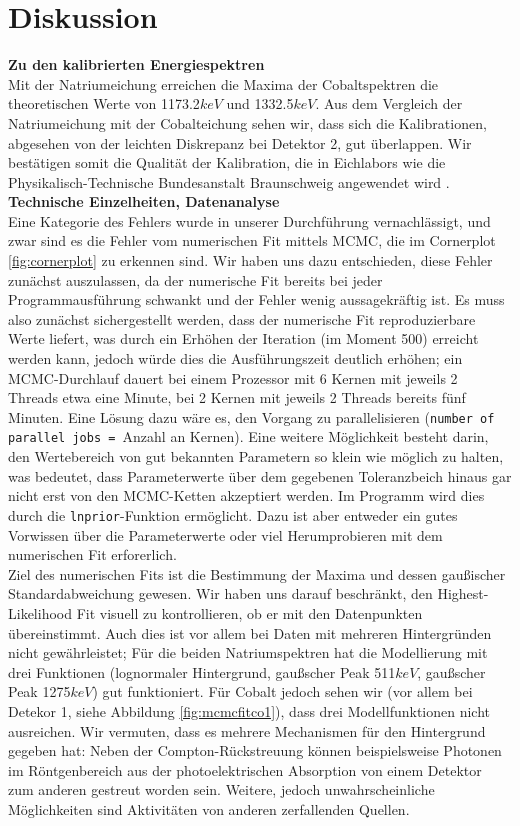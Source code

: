 \documentclass[%
aps,
onecolumn,
11pt,
tightenlines,
nofootinbib,
superscriptaddress,
floatfix,
prd,
]{revtex4-2}
\begin{document}
\section{Diskussion}
\label{sec:Diskussion}
\textbf{Zu den kalibrierten Energiespektren}\\
Mit der Natriumeichung erreichen die Maxima der Cobaltspektren die theoretischen Werte von 1173.2$keV$ und 1332.5$keV$. Aus dem Vergleich der Natriumeichung mit der Cobalteichung sehen wir, dass sich die Kalibrationen, abgesehen von der leichten Diskrepanz bei Detektor 2, gut überlappen. Wir bestätigen somit die Qualität der Kalibration, die in Eichlabors wie die Physikalisch-Technische Bundesanstalt Braunschweig angewendet wird \cite{manual1}.\vspace{10pt}\\
\textbf{Technische Einzelheiten, Datenanalyse}\\
Eine Kategorie des Fehlers wurde in unserer Durchführung vernachlässigt, und zwar sind es die Fehler vom numerischen Fit mittels MCMC, die im Cornerplot \ref{fig:cornerplot} zu erkennen sind. Wir haben uns dazu entschieden, diese Fehler zunächst auszulassen, da der numerische Fit bereits bei jeder Programmausführung schwankt und der Fehler wenig aussagekräftig ist. Es muss also zunächst sichergestellt werden, dass der numerische Fit reproduzierbare Werte liefert, was durch ein Erhöhen der Iteration (im Moment 500) erreicht werden kann, jedoch würde dies die Ausführungszeit deutlich erhöhen; ein MCMC-Durchlauf dauert bei einem Prozessor mit 6 Kernen mit jeweils 2 Threads etwa eine Minute, bei 2 Kernen mit jeweils 2 Threads bereits fünf Minuten. Eine Lösung dazu wäre es, den Vorgang zu parallelisieren (\texttt{number of parallel jobs = }Anzahl an Kernen). Eine weitere Möglichkeit besteht darin, den Wertebereich von gut bekannten Parametern so klein wie möglich zu halten, was bedeutet, dass Parameterwerte über dem gegebenen Toleranzbeich hinaus gar nicht erst von den MCMC-Ketten akzeptiert werden. Im Programm wird dies durch die \texttt{lnprior}-Funktion ermöglicht. Dazu ist aber entweder ein gutes Vorwissen über die Parameterwerte oder viel Herumprobieren mit dem numerischen Fit erforerlich.\\
Ziel des numerischen Fits ist die Bestimmung der Maxima und dessen gaußischer Standardabweichung gewesen. Wir haben uns darauf beschränkt, den Highest-Likelihood Fit visuell zu kontrollieren, ob er mit den Datenpunkten übereinstimmt. Auch dies ist vor allem bei Daten mit mehreren Hintergründen nicht gewährleistet; Für die beiden Natriumspektren hat die Modellierung mit drei Funktionen (lognormaler Hintergrund, gaußscher Peak 511$keV$, gaußscher Peak 1275$keV$) gut funktioniert. Für Cobalt jedoch sehen wir (vor allem bei Detekor 1, siehe Abbildung \ref{fig:mcmcfitco1}), dass drei Modellfunktionen nicht ausreichen. Wir vermuten, dass es mehrere Mechanismen für den Hintergrund gegeben hat: Neben der Compton-Rückstreuung können beispielsweise Photonen im Röntgenbereich aus der photoelektrischen Absorption von einem Detektor zum anderen gestreut worden sein. Weitere, jedoch unwahrscheinliche Möglichkeiten sind Aktivitäten von anderen zerfallenden Quellen.\\
\end{document}
